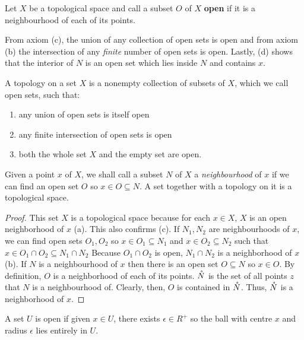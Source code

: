 \begin{definition}[Open]
    Let $X$ be a topological space and call a subset $O$ of $X$ \textbf{open} if it is a neighbourhood of each of its points.
\end{definition}
\begin{remark}
    From axiom (c), the union of any collection of open sets is open and from axiom (b) the intersection of any \emph{finite} number of open sets is open. Lastly, (d) shows that the interior of $N$ is an open set which lies inside $N$ and contains $x$. 
\end{remark}
\begin{definition}
    A topology on a set $X$ is a nonempty collection of subsets of $X$, which we call open sets, such that:
    \begin{enumerate}
        \item any union of open sets is itself open
        \item any finite intersection of open sets is open
        \item both the whole set $X$ and the empty set are open.
    \end{enumerate}
    Given a point $x$ of $X$, we shall call a subset $N$ of $X$ a \emph{neighbourhood} of $x$ if we can find an open set $O$ so $x \in O \subseteq N$. A set together with a topology on it is a topological space.
\end{definition}
\begin{proof}
    This set $X$ is a topological space because for each $x \in X$, $X$ is an open neighborhood of $x$ (a). This also confirms (c). If $N_1, N_2$ are neighbourhoods of $x$, we can find open sets $O_1, O_2$ so $x \in O_1 \subseteq N_1$ and $x \in O_2 \subseteq N_2$ such that $x \in O_1 \cap O_2 \subseteq N_1 \cap N_2$ Because $O_1 \cap O_2$ is open, $N_1 \cap N_2$ is a neighborhood of $x$ (b). If $N$ is a neighbourhood of $x$ then there is an open set $O \subseteq N$ so $x \in O$. By definition, $O$ is a neighborhood of each of its points. $\mathring{N}$ is the set of all points $z$ that $N$ is a neighbourhood of. Clearly, then, $O$ is contained in $\mathring{N}$. Thus, $\mathring{N}$ is a neighborhood of $x$.
\end{proof}
\begin{definition}
    A set $U$ is open if given $x \in U$, there exists $\epsilon \in R^+$ so the ball with centre $x$ and radius $\epsilon$ lies entirely in $U$.
\end{definition}

